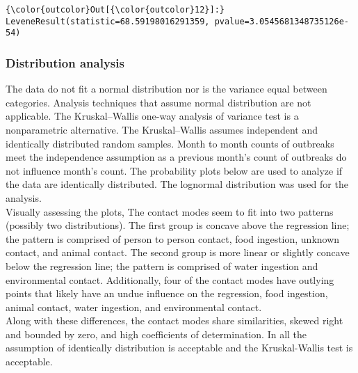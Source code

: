 \documentclass[11pt]{article}
\begin{document}
\begin{Verbatim}[commandchars=\\\{\}]
{\color{outcolor}Out[{\color{outcolor}12}]:} LeveneResult(statistic=68.59198016291359, pvalue=3.0545681348735126e-54)
\end{Verbatim}
            
    \hypertarget{distribution-analysis}{%
\subsubsection{Distribution analysis}\label{distribution-analysis}}

The data do not fit a normal distribution nor is the variance equal
between categories. Analysis techniques that assume normal distribution
are not applicable. The Kruskal--Wallis one-way analysis of variance
test is a nonparametric alternative. The Kruskal--Wallis assumes
independent and identically distributed random samples. Month to month
counts of outbreaks meet the independence assumption as a previous
month's count of outbreaks do not influence month's count. The
probability plots below are used to analyze if the data are identically
distributed. The lognormal distribution was used for the analysis.\\
Visually assessing the plots, The contact modes seem to fit into two
patterns (possibly two distributions). The first group is concave above
the regression line; the pattern is comprised of person to person
contact, food ingestion, unknown contact, and animal contact. The second
group is more linear or slightly concave below the regression line; the
pattern is comprised of water ingestion and environmental contact.
Additionally, four of the contact modes have outlying points that likely
have an undue influence on the regression, food ingestion, animal
contact, water ingestion, and environmental contact.\\
Along with these differences, the contact modes share similarities,
skewed right and bounded by zero, and high coefficients of
determination. In all the assumption of identically distribution is
acceptable and the Kruskal-Wallis test is acceptable.
\end{document}
